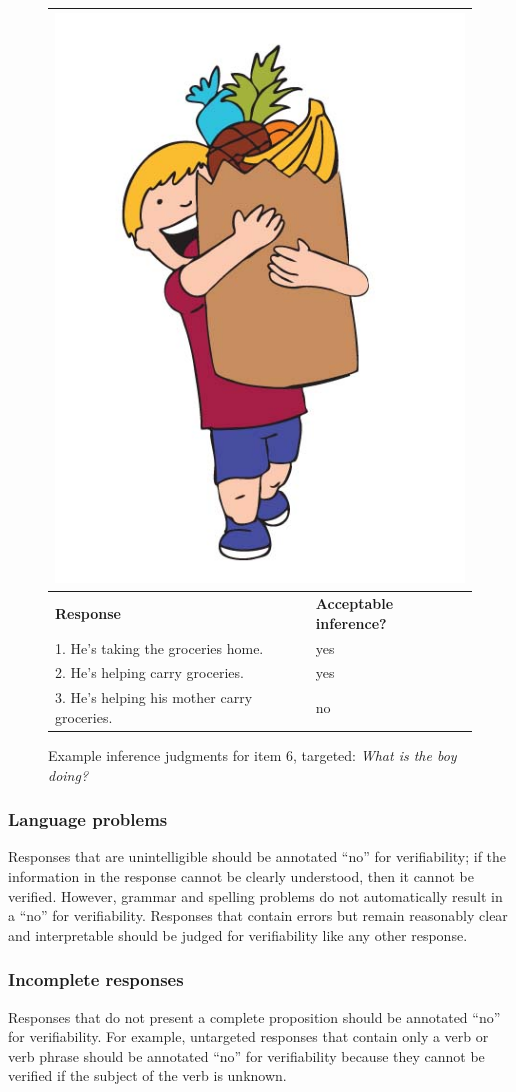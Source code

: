 \documentclass[12pt,notitlepage]{article}
\begin{document}
\begin{figure}[h]
\begin{center}
\begin{tabular}{|p{}|p{}|}
\hline
\multicolumn{2}{|c|}{\includegraphics[width=0.4\columnwidth,trim=0 0 0 -3]{figures/I06.jpg}}\\
\hline
\textbf{Response} & \textbf{Acceptable inference?}\\
\hline
1. He's taking the groceries home. & yes \\
\hline
2. He's helping carry groceries. & yes \\
\hline
3. He's helping his mother carry groceries. & no \\
\hline
\end{tabular}{}
\end{center}
\caption{Example inference judgments for item 6, targeted: \textit{What is the boy doing?}}
\label{fig:carry-groceries}
\end{figure}

\subsubsection{Language problems} Responses that are unintelligible should be annotated ``no'' for verifiability; if the information in the response cannot be clearly understood, then it cannot be verified. However, grammar and spelling problems do not automatically result in a ``no'' for verifiability. Responses that contain errors but remain reasonably clear and interpretable should be judged for verifiability like any other response.

\subsubsection{Incomplete responses} Responses that do not present a complete proposition should be annotated ``no'' for verifiability. For example, untargeted responses that contain only a verb or verb phrase should be annotated ``no'' for verifiability because they cannot be verified if the subject of the verb is unknown.
\end{document}
